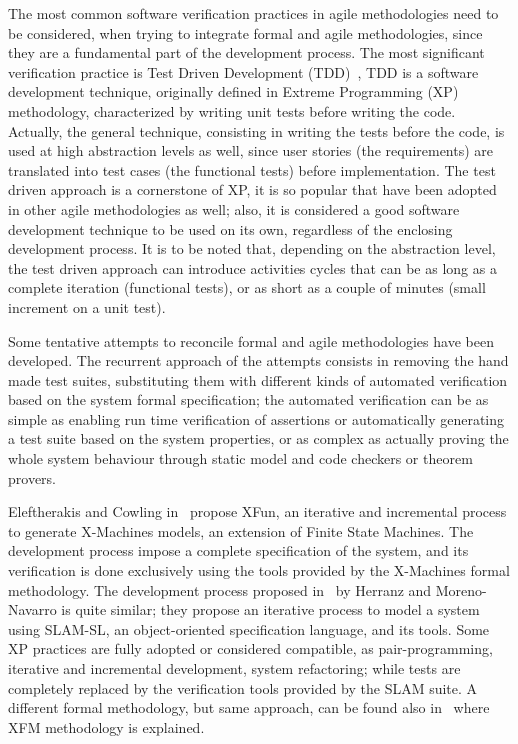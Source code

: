 \documentclass[english]{lni}
\begin{document}
The most common software verification practices in agile methodologies need to be considered, when trying to integrate formal and agile methodologies, since they are a fundamental part of the development process. 
The most significant verification practice is Test Driven Development (TDD)~\cite{Beck2003}, TDD is a software development technique, originally defined in Extreme Programming (XP)~\cite{Beck2004} methodology, characterized by writing unit tests before writing the code.
Actually, the general technique, consisting in writing the tests before the code, is used at high abstraction levels as well, since user stories (the requirements) are translated into test cases (the functional tests) before implementation.
The test driven approach is a cornerstone of XP, it is so popular that have been adopted in other agile methodologies as well; also, it is considered a good software development technique to be used on its own, regardless of the enclosing development process.
It is to be noted that, depending on the abstraction level, the test driven approach can introduce activities cycles that can be as long as a complete iteration (functional tests), or as short as a couple of minutes (small increment on a unit test).

Some tentative attempts to reconcile formal and agile methodologies have been developed.
The recurrent approach of the attempts consists in removing the hand made test suites, substituting them with different kinds of automated verification based on the system formal specification; the automated verification can be as simple as enabling run time verification of assertions or automatically generating a test suite based on the system properties, or as complex as actually proving the whole system behaviour through static model and code checkers or theorem provers.

Eleftherakis and Cowling in~\cite{Eleftherakis2003} propose XFun, an iterative and incremental process to generate X-Machines models, an extension of Finite State Machines. 
The development process impose a complete specification of the system, and its verification is done exclusively using the tools provided by the X-Machines formal methodology. 
The development process proposed in~\cite{Herranz2003b} by Herranz and Moreno-Navarro is quite similar; they propose an iterative process to model a system using SLAM-SL, an object-oriented specification language, and its tools. 
Some XP practices are fully adopted or considered compatible, as pair-programming, iterative and incremental development, system refactoring; while tests are completely replaced by the verification tools provided by the SLAM suite.
A different formal methodology, but same approach, can be found also in~\cite{Suhaib2005} where XFM methodology is explained.
\end{document}
